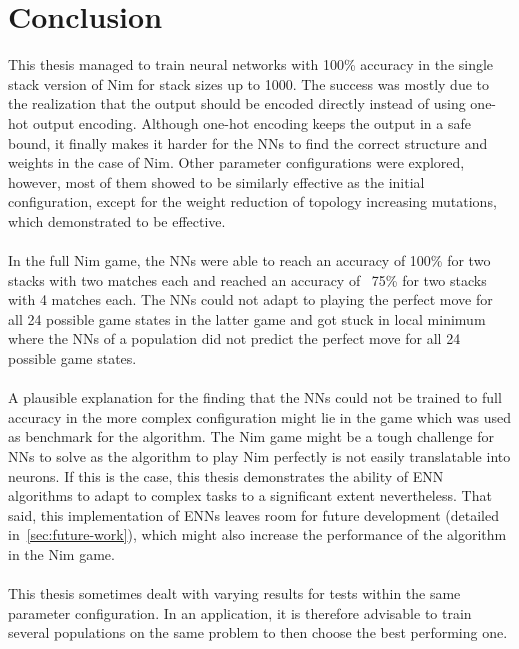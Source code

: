 \section{Conclusion}\label{sec:conclusion}
This thesis managed to train neural networks with 100\% accuracy in the single stack version of Nim for stack sizes up to 1000.
The success was mostly due to the realization that the output should be encoded directly instead of using one-hot output encoding.
Although one-hot encoding keeps the output in a safe bound, it finally makes it harder for the NNs to find the correct structure and weights in the case of Nim.
Other parameter configurations were explored, however, most of them showed to be similarly effective as the initial configuration, except for the weight reduction of topology increasing mutations, which demonstrated to be effective.
\\ \\
In the full Nim game, the NNs were able to reach an accuracy of 100\% for two stacks with two matches each and reached an accuracy of ~75\% for two stacks with 4 matches each.
The NNs could not adapt to playing the perfect move for all 24 possible game states in the latter game and got stuck in local minimum where the NNs of a population did not predict the perfect move for all 24 possible game states.
\\\\
A plausible explanation for the finding that the NNs could not be trained to full accuracy in the more complex configuration might lie in the game which was used as benchmark for the algorithm.
The Nim game might be a tough challenge for NNs to solve as the algorithm to play Nim perfectly is not easily translatable into neurons.
If this is the case, this thesis demonstrates the ability of ENN algorithms to adapt to complex tasks to a significant extent nevertheless.
That said, this implementation of ENNs leaves room for future development (detailed in~\ref{sec:future-work}), which might also increase the performance of the algorithm in the Nim game.
\\ \\
This thesis sometimes dealt with varying results for tests within the same parameter configuration.
In an application, it is therefore advisable to train several populations on the same problem to then choose the best performing one.


